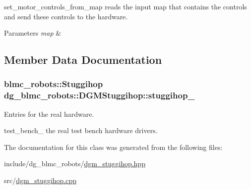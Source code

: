 set\+\_\+motor\+\_\+controls\+\_\+from\+\_\+map reads the input map that contains the controls and send these controls to the hardware. 


\begin{DoxyParams}{Parameters}
{\em map} & \\
\hline
\end{DoxyParams}


\subsection{Member Data Documentation}
\subsubsection[{\texorpdfstring{stuggihop\+\_\+}{stuggihop_}}]{\setlength{\rightskip}{0pt plus 5cm}blmc\+\_\+robots\+::\+Stuggihop dg\+\_\+blmc\+\_\+robots\+::\+D\+G\+M\+Stuggihop\+::stuggihop\+\_\+\hspace{0.3cm}{\ttfamily [private]}}\hypertarget{classdg__blmc__robots_1_1DGMStuggihop_a70126fb0319274141ab4a6193e7c7121}{}\label{classdg__blmc__robots_1_1DGMStuggihop_a70126fb0319274141ab4a6193e7c7121}


Entries for the real hardware. 

test\+\_\+bench\+\_\+ the real test bench hardware drivers. 

The documentation for this class was generated from the following files\+:\begin{DoxyCompactItemize}
\item 
include/dg\+\_\+blmc\+\_\+robots/\hyperlink{dgm__stuggihop_8hpp}{dgm\+\_\+stuggihop.\+hpp}\item 
src/\hyperlink{dgm__stuggihop_8cpp}{dgm\+\_\+stuggihop.\+cpp}\end{DoxyCompactItemize}
